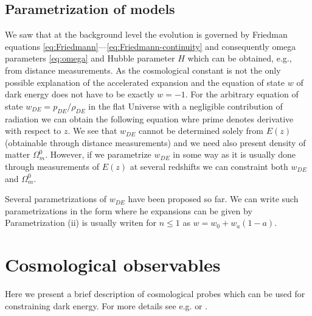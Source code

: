 
\subsection{Parametrization of models}

We saw that at the background level the evolution is governed by Friedman equations \eqref{eq:Friedmann}---\eqref{eq:Friedmann-continuity} and consequently omega parameters \eqref{eq:omega} and Hubble parameter $H$ which can be obtained, e.g., from distance measurements. As  the cosmological constant is not the only possible explanation of the accelerated expansion and the equation of state \(w\) of dark energy does not have to be exactly \(w=-1\). For the arbitrary equation of state $w_{DE}=p_{DE}/\rho_{DE}$ in the flat Universe with a negligible contribution of radiation we can obtain the following equation
whre prime denotes derivative with respect to \(z\). We see that \(w_{DE}\) cannot be determined solely from \(E(z)\) (obtainable through distance measurements) and we need also present density of matter \(\Omega_m^0\). However, if we parametrize \(w_{DE}\) in some way as it is usually done through measurements of \(E(z)\) at several redshifts we can constraint both \(w_{DE}\) and \(\Omega_m^0\).

Several parametrizations of \(w_{DE}\) have been proposed so far. We can write such parametrizations in the form
where he expansions can be given by
Parametrization (ii) is usually writen for \(n\leq1\) as \(w=w_0+w_a(1-a)\).


\section{Cosmological observables}
Here we present a brief description of cosmological probes which can be used for constraining dark energy. For more details see e.g. \textcite{weinberg_observational_2013} or \textcite{DE_probes2}.
